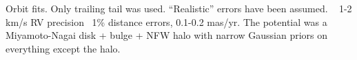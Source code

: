 Orbit fits. Only trailing tail was used. ``Realistic'' errors have been assumed. ~ 1-2 km/s RV precision ~1\% distance errors, 0.1-0.2 mas/yr. The potential was a Miyamoto-Nagai disk + bulge + NFW halo with narrow Gaussian priors on everything except the halo.